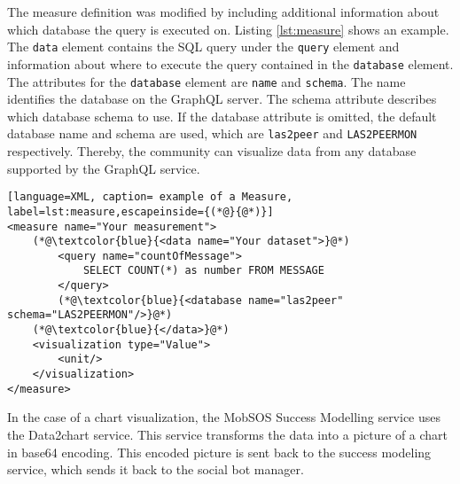The measure definition was modified by including additional information about which database the query is executed on. 
Listing \ref{lst:measure} shows an example.
The \texttt{data} element contains the SQL query under the \texttt{query} element and information about where to execute the query contained in the \texttt{database} element.
The attributes for the \texttt{database} element are \texttt{name} and \texttt{schema}. The name identifies the database on the GraphQL server. 
The schema attribute describes which database schema to use.
If the database attribute is omitted, the default database name and schema are used, which are \texttt{las2peer} and \texttt{LAS2PEERMON} respectively.
Thereby, the community can visualize data from any database supported by the GraphQL service.

\begin{lstlisting}[language=XML, caption= example of a Measure, label=lst:measure,escapeinside={(*@}{@*)}]
<measure name="Your measurement">
    (*@\textcolor{blue}{<data name="Your dataset">}@*)   
        <query name="countOfMessage">
            SELECT COUNT(*) as number FROM MESSAGE
        </query>
        (*@\textcolor{blue}{<database name="las2peer" schema="LAS2PEERMON"/>}@*)
    (*@\textcolor{blue}{</data>}@*)
    <visualization type="Value">
        <unit/>
    </visualization>
</measure>
\end{lstlisting}

In the case of a chart visualization, the MobSOS Success Modelling service uses the Data2chart service. This service transforms the data into a picture of a chart in base64 encoding. This encoded picture is sent back to the success modeling service, which sends it back to the social bot manager.

